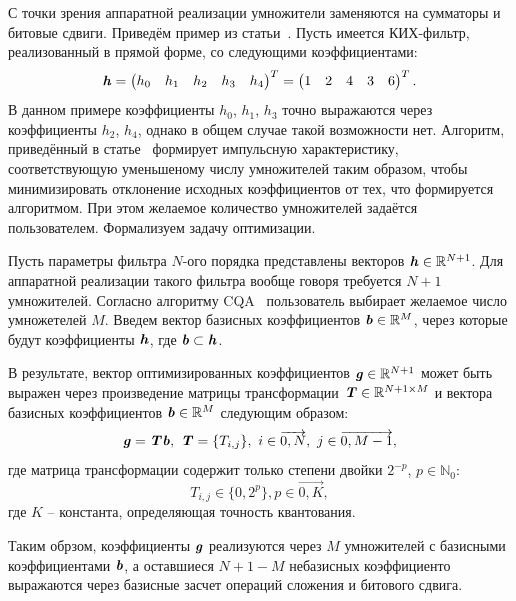 С точки зрения аппаратной реализации умножители заменяются на сумматоры и битовые сдвиги. Приведём пример из статьи~\cite{fir_quant}. Пусть имеется КИХ-фильтр, реализованный в прямой форме, со следующими коэффициентами:
\begin{equation}
	\textbf{\textit{h}}=\begin{pmatrix}
		h_0 & h_1 & h_2 & h_3 & h_4
	\end{pmatrix}^T=
	\begin{pmatrix}
		1 & 2 & 4 & 3 & 6
	\end{pmatrix}^T.
	\label{quant_fir_example}
\end{equation}
В данном примере коэффициенты $h_0$, $h_1$, $h_3$ точно выражаются через коэффициенты $h_2$, $h_4$, однако в общем случае такой возможности нет. Алгоритм, приведённый в статье~\cite{fir_quant} формирует импульсную характеристику, соответствующую уменьшеному числу умножителей таким образом, чтобы минимизировать отклонение исходных коэффициентов от тех, что формируется алгоритмом. При этом желаемое количество умножителей задаётся пользователем. Формализуем задачу оптимизации.

Пусть параметры фильтра $N$-ого порядка представлены векторов $\textbf{\textit{h}}\in\mathbb{R}^{N+1}$. Для аппаратной реализации такого фильтра вообще говоря требуется $N+1$ умножителей. Согласно алгоритму CQA~\cite{fir_quant} пользователь выбирает желаемое число умножетелей $M$. Введем вектор базисных коэффициентов $\textbf{\textit{b}}\in\mathbb{R}^{M}$, через которые будут коэффициенты $\textbf{\textit{h}}$, где $\textbf{\textit{b}}\subset\textbf{\textit{h}}$.

В результате, вектор оптимизированных коэффициентов $\textbf{\textit{g}}\in\mathbb{R}^{N+1}$ может быть выражен через произведение матрицы трансформации $\textbf{\textit{T}}\in\mathbb{R}^{N+1\times M}$ и вектора базисных коэффициентов $\textbf{\textit{b}}\in\mathbb{R}^{M}$ следующим образом:
\begin{equation}
	\textbf{\textit{g}}=\textbf{\textit{T}}\textbf{\textit{b}}, \ \textbf{\textit{T}}=\{T_{i, j}\}, \ i\in\overrightarrow{0, N}, \ j\in\overrightarrow{0, M-1},
	\label{transform_matrix_output}
\end{equation}
где матрица трансформации содержит только степени двойки $2^{-p}$, $p\in\mathbb{N}_0$:
\begin{equation}
	T_{i, j}\in\{0, 2^{p}\}, p\in\overrightarrow{0, K}, 
	\label{transform_matrix}
\end{equation}
где $K$ -- константа, определяющая точность квантования.

Таким обрзом, коэффициенты $\textbf{\textit{g}}$ реализуются через $M$ умножителей с базисными коэффициентами $\textbf{\textit{b}}$, а оставшиеся $N+1-M$ небазисных коэффициенто выражаются через базисные засчет операций сложения и битового сдвига.

